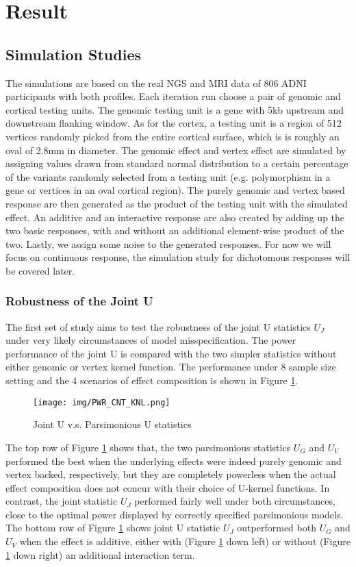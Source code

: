 \section{Result}
\subsection{Simulation Studies}
The simulations are based on the real NGS and MRI data of 806 ADNI participants with both profiles. Each iteration run choose a pair of genomic and cortical testing units. The genomic testing unit is a gene with 5kb upstream and downstream flanking window. As for the cortex, a testing unit is a region of 512 vertices randomly picked from the entire cortical surface, which is is roughly an oval of 2.8mm in diameter. The genomic effect and vertex effect are simulated by assigning values drawn from standard normal distribution to a certain percentage of the variants randomly selected from a testing unit (e.g. polymorphism in a gene or vertices in an oval cortical region). The purely genomic and vertex based response are then generated as the product of the testing unit with the simulated effect. An additive and an interactive response are also created by adding up the two basic responses, with and without an additional element-wise product of the two. Lastly, we assign some noise to the generated responses. For now we will focus on continuous response, the simulation study for dichotomous responses will be covered later.

\subsubsection{Robustness of the Joint U}
The first set of study aims to test the robustness of the joint U statistics $U_J$ under very likely circumstances of model misspecification. The power performance of the joint U is compared with the two simpler statistics without either genomic or vertex kernel function. The performance under 8 sample size setting and the 4 scenarios of effect composition is shown in Figure \ref{fig:PWR_CNT_KNL}.
\begin{figure}[!htbp]
\centering
\texttt{[image: img/PWR\_CNT\_KNL.png]}
\caption{Joint U v.s. Parsimonious U statistics}
\label{fig:PWR_CNT_KNL}
\end{figure}
The top row of Figure \ref{fig:PWR_CNT_KNL} shows that, the two parsimonious statistics $U_G$ and $U_V$ performed the best when the underlying effects were indeed purely genomic and vertex backed, respectively, but they are completely powerless when the actual effect composition does not concur with their choice of U-kernel functions. In contrast, the joint statistic $U_J$ performed fairly well under both circumstances, close to the optimal power displayed by correctly specified parsimonious models. The bottom row of Figure \ref{fig:PWR_CNT_KNL} shows joint U statistic $U_J$ outperformed both $U_G$ and $U_V$ when the effect is additive, either with (Figure \ref{fig:PWR_CNT_KNL} down left) or without (Figure \ref{fig:PWR_CNT_KNL} down right) an additional interaction term.

